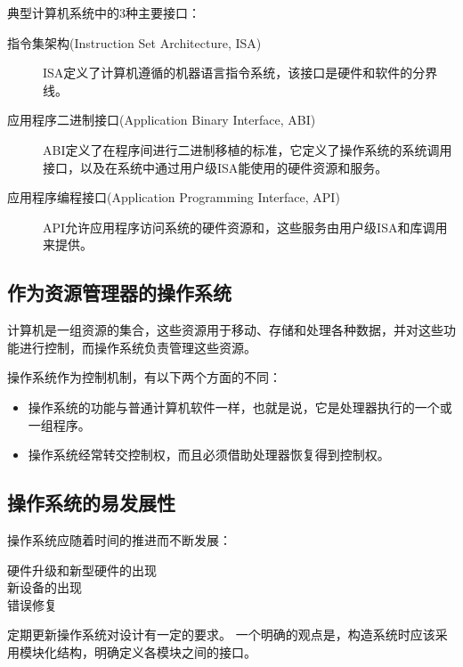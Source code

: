 {{        典型计算机系统中的3种主要接口：

        \begin{description}
            \item[指令集架构(Instruction Set Architecture, ISA)]
            {
                ISA定义了计算机遵循的机器语言指令系统，该接口是硬件和软件的分界线。
            }
            \item[应用程序二进制接口(Application Binary Interface, ABI)]
            {
                ABI定义了在程序间进行二进制移植的标准，它定义了操作系统的系统调用接口，以及在系统中通过用户级ISA能使用的硬件资源和服务。
            }
            \item[应用程序编程接口(Application Programming Interface, API)]
            {
                API允许应用程序访问系统的硬件资源和，这些服务由用户级ISA和库调用来提供。
            }
        \end{description}
    }

    \subsection{作为资源管理器的操作系统}
    {
        计算机是一组资源的集合，这些资源用于移动、存储和处理各种数据，并对这些功能进行控制，而操作系统负责管理这些资源。

        操作系统作为控制机制，有以下两个方面的不同：

        \begin{itemize}
            \item 操作系统的功能与普通计算机软件一样，也就是说，它是处理器执行的一个或一组程序。
            \item 操作系统经常转交控制权，而且必须借助处理器恢复得到控制权。
        \end{itemize}
    }

    \subsection{操作系统的易发展性}
    {
        操作系统应随着时间的推进而不断发展：

        \begin{description}
            \item[硬件升级和新型硬件的出现]
            \item[新设备的出现]
            \item[错误修复]
        \end{description}

        定期更新操作系统对设计有一定的要求。
        一个明确的观点是，构造系统时应该采用模块化结构，明确定义各模块之间的接口。
    }
}
